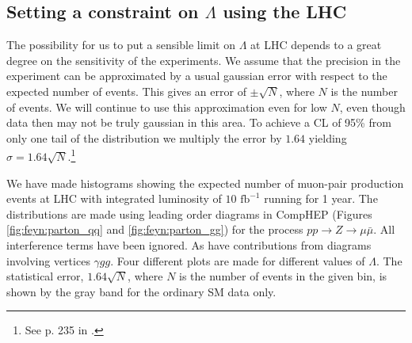
\subsection{Setting a constraint on $\Lambda$ using the LHC}
The possibility for us to put a sensible limit on $\Lambda$ at LHC depends to a great degree on the sensitivity of the experiments. We assume that the precision in the experiment can be approximated by a usual gaussian error with respect to the expected number of events. This gives an error of $\pm \sqrt{N}$, where $N$ is the number of events. We will continue to use this approximation even for low $N$, even though data then may not be truly gaussian in this area. To achieve a CL of 95\% from only one tail of the distribution we multiply the error by $1.64$ yielding $\sigma = 1.64 \sqrt{N}$.\footnote{See p. 235 in \cite{hagiwara2002rpp}.}

We have made histograms showing the expected number of muon-pair production events at LHC with integrated luminosity of $10 \textrm{ fb}^{-1}$ running for 1 year. The distributions are made using leading order diagrams in CompHEP (Figures \ref{fig:feyn:parton_qq} and \ref{fig:feyn:parton_gg}) for the process $pp \rightarrow Z \rightarrow \mu \bar \mu$. All interference terms have been ignored. As have contributions from diagrams involving vertices $\gamma gg$. Four different plots are made for different values of $\Lambda$. The statistical error, $1.64\sqrt{N}$, where $N$ is the number of events in the given bin, is shown by the gray band for the ordinary SM data only.

